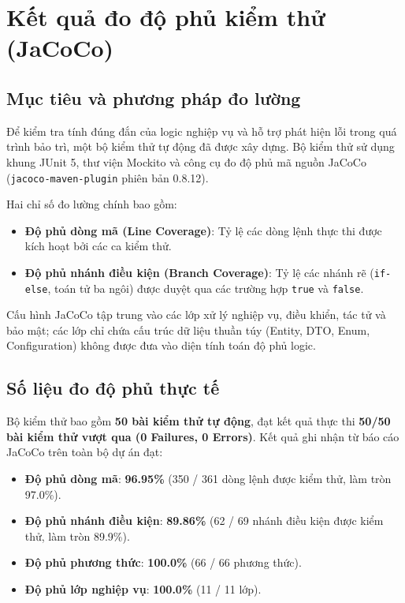 \documentclass[12pt,a4paper]{report}
\begin{document}
\section{Kết quả đo độ phủ kiểm thử (JaCoCo)}

\subsection{Mục tiêu và phương pháp đo lường}
Để kiểm tra tính đúng đắn của logic nghiệp vụ và hỗ trợ phát hiện lỗi trong quá trình bảo trì, một bộ kiểm thử tự động đã được xây dựng. Bộ kiểm thử sử dụng khung JUnit 5, thư viện Mockito và công cụ đo độ phủ mã nguồn JaCoCo (\texttt{jacoco-maven-plugin} phiên bản 0.8.12).

Hai chỉ số đo lường chính bao gồm:
\begin{itemize}
    \item \textbf{Độ phủ dòng mã (Line Coverage)}: Tỷ lệ các dòng lệnh thực thi được kích hoạt bởi các ca kiểm thử.
    \item \textbf{Độ phủ nhánh điều kiện (Branch Coverage)}: Tỷ lệ các nhánh rẽ (\texttt{if-else}, toán tử ba ngôi) được duyệt qua các trường hợp \texttt{true} và \texttt{false}.
\end{itemize}

Cấu hình JaCoCo tập trung vào các lớp xử lý nghiệp vụ, điều khiển, tác tử và bảo mật; các lớp chỉ chứa cấu trúc dữ liệu thuần túy (Entity, DTO, Enum, Configuration) không được đưa vào diện tính toán độ phủ logic.

\subsection{Số liệu đo độ phủ thực tế}
Bộ kiểm thử bao gồm \textbf{50 bài kiểm thử tự động}, đạt kết quả thực thi \textbf{50/50 bài kiểm thử vượt qua (0 Failures, 0 Errors)}. Kết quả ghi nhận từ báo cáo JaCoCo trên toàn bộ dự án đạt:
\begin{itemize}
    \item \textbf{Độ phủ dòng mã}: \textbf{96.95\%} (350 / 361 dòng lệnh được kiểm thử, làm tròn 97.0\%).
    \item \textbf{Độ phủ nhánh điều kiện}: \textbf{89.86\%} (62 / 69 nhánh điều kiện được kiểm thử, làm tròn 89.9\%).
    \item \textbf{Độ phủ phương thức}: \textbf{100.0\%} (66 / 66 phương thức).
    \item \textbf{Độ phủ lớp nghiệp vụ}: \textbf{100.0\%} (11 / 11 lớp).
\end{itemize}
\end{document}
